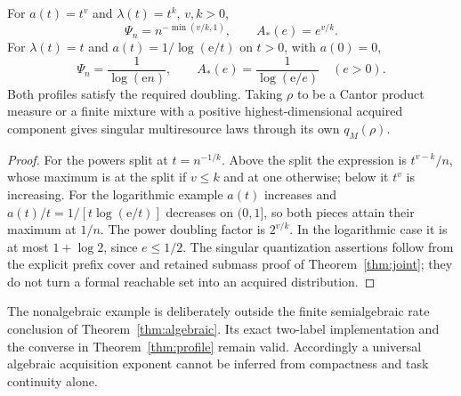 \begin{corollary}\label{cor:profile-examples}
For $a(t)=t^v$ and $\lambda(t)=t^k$, $v,k>0$,
\[
 \Psi_n=n^{-\min(v/k,1)},\qquad A_*(e)=e^{v/k}.
\]
For $\lambda(t)=t$ and $a(t)=1/\log(\mathrm e/t)$ on $t>0$, with $a(0)=0$,
\[
 \Psi_n=\frac1{\log(\mathrm e n)},\qquad
 A_*(e)=\frac1{\log(\mathrm e/e)}\quad(e>0).
\]
Both profiles satisfy the required doubling. Taking $\rho$ to be a Cantor product measure or a finite mixture with a positive highest-dimensional acquired component gives singular multiresource laws through its own $q_M(\rho)$.
\end{corollary}
\begin{proof}
For the powers split at $t=n^{-1/k}$. Above the split the expression is $t^{v-k}/n$, whose maximum is at the split if $v\le k$ and at one otherwise; below it $t^v$ is increasing. For the logarithmic example $a(t)$ increases and $a(t)/t=1/[t\log(\mathrm e/t)]$ decreases on $(0,1]$, so both pieces attain their maximum at $1/n$. The power doubling factor is $2^{v/k}$. In the logarithmic case it is at most $1+\log2$, since $e\le1/2$. The singular quantization assertions follow from the explicit prefix cover and retained submass proof of Theorem~\ref{thm:joint}; they do not turn a formal reachable set into an acquired distribution.
\end{proof}
The nonalgebraic example is deliberately outside the finite semialgebraic rate conclusion of Theorem~\ref{thm:algebraic}. Its exact two-label implementation and the converse in Theorem~\ref{thm:profile} remain valid. Accordingly a universal algebraic acquisition exponent cannot be inferred from compactness and task continuity alone.
